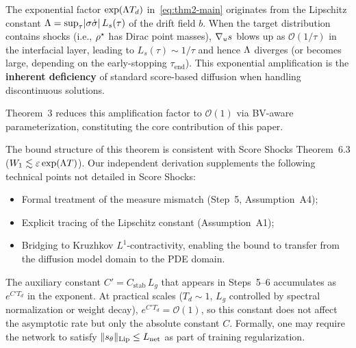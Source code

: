 \begin{remark}
\label{rem:exp-origin}
The exponential factor $\exp(\Lambda T_{d})$ in~\eqref{eq:thm2-main} originates from the Lipschitz constant $\Lambda = \sup_{\tau} \lvert \sigma \dot\sigma \rvert\,L_{s}(\tau)$ of the drift field $b$. When the target distribution contains shocks (i.e., $\rho^{\star}$ has Dirac point masses), $\nabla_{u} s$ blows up as $\mathcal{O}(1/\tau)$ in the interfacial layer, leading to $L_{s}(\tau) \sim 1/\tau$ and hence $\Lambda$ diverges (or becomes large, depending on the early-stopping $\tau_{\mathrm{end}}$). This exponential amplification is the \textbf{inherent deficiency} of standard score-based diffusion when handling discontinuous solutions.

Theorem~3 reduces this amplification factor to $\mathcal{O}(1)$ via BV-aware parameterization, constituting the core contribution of this paper.
\end{remark}

\begin{remark}
\label{rem:score-shocks-relation}
The bound structure of this theorem is consistent with Score Shocks Theorem~6.3 ($W_{1} \lesssim \varepsilon \exp(\Lambda T)$). Our independent derivation supplements the following technical points not detailed in Score Shocks:
\begin{itemize}
\item Formal treatment of the measure mismatch (Step~5, Assumption~A4);
\item Explicit tracing of the Lipschitz constant (Assumption~A1);
\item Bridging to Kruzhkov $L^{1}$-contractivity, enabling the bound to transfer from the diffusion model domain to the PDE domain.
\end{itemize}
\end{remark}

\begin{remark}
\label{rem:C-prime}
The auxiliary constant $C' = C_{\mathrm{stab}}\,L_{g}$ that appears in Steps~5--6 accumulates as $e^{C' T_{d}}$ in the exponent. At practical scales ($T_{d} \sim 1$, $L_{g}$ controlled by spectral normalization or weight decay), $e^{C' T_{d}} = \mathcal{O}(1)$, so this constant does not affect the asymptotic rate but only the absolute constant $C$. Formally, one may require the network to satisfy $\lVert s_{\theta} \rVert_{\mathrm{Lip}} \le L_{\mathrm{net}}$ as part of training regularization.
\end{remark}
